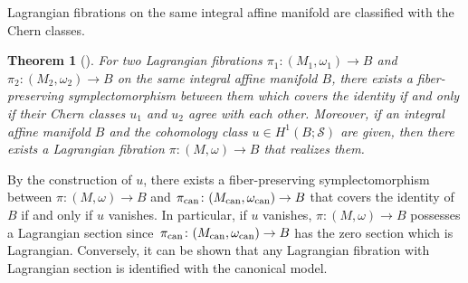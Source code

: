 \documentclass[10pt,a4paper]{amsart}
\numberwithin{equation}{section}
\newtheorem{Theorem}{Theorem}[section]
\newcommand{\SCS}{\mathscr S}
\begin{document}
Lagrangian fibrations on the same integral affine manifold are classified with the Chern classes.
\begin{Theorem}[\cite{Du}]\label{classification}
For two Lagrangian fibrations $\pi_1\colon (M_1,\omega_1)\to B$ and ${\pi_2\colon (M_2,\omega_2)\to B}$ on the same integral affine manifold $B$, there exists a fiber-preserving symplectomorphism between them which covers the identity if and only if their Chern classes $u_1$ and $u_2$ agree with each other. Moreover, if an integral affine manifold $B$ and the cohomology class $u\in H^1(B;\SCS)$ are given, then there exists a Lagrangian fibration $\pi\colon (M,\omega)\to B$ that realizes them.
\end{Theorem}
\begin{Remark}
By the construction of $u$, there exists a fiber-preserving symplectomorphism between $\pi \colon (M,\omega)\to B$ and $\pi_{\rm can}\colon (M_{\rm can},\omega_{\rm can})\to B$ that covers the identity of $B$ if and only if $u$ vanishes. In particular, if $u$ vanishes, $\pi \colon (M,\omega)\to B$ possesses a Lagrangian section since~${\pi_{\rm can}\colon (M_{\rm can},\omega_{\rm can})\to B}$ has the zero section which is Lagrangian. Conversely, it can be shown that any Lagrangian fibration with Lagrangian section is identified with the canonical model.
\end{Remark}
\end{document}
